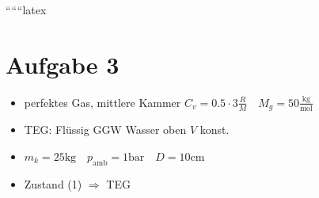 
``````latex


\section*{Aufgabe 3}

\begin{itemize}
    \item perfektes Gas, mittlere Kammer $C_v = 0.5 \cdot 3 \frac{R}{M} \quad M_g = 50 \frac{\text{kg}}{\text{mol}}$
    \item TEG: Flüssig GGW Wasser oben $V$ konst.
    \item $m_k = 25 \text{kg} \quad p_{\text{amb}} = 1 \text{bar} \quad D = 10 \text{cm}$
    \item Zustand (1) $\Rightarrow$ TEG
\end{itemize}


